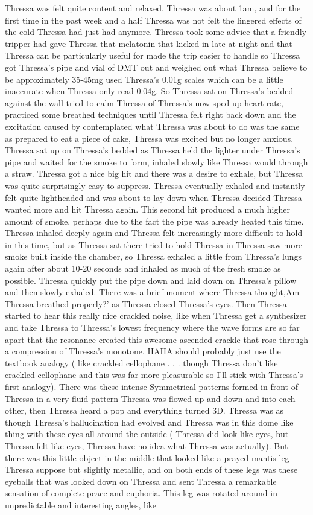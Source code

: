 \documentclass[12pt]{book}
\begin{document}
Thressa was felt quite content and relaxed. Thressa was about 1am, and for the first time in the past week and a half Thressa was not felt the lingered effects of the cold Thressa had just had anymore. Thressa took some advice that a friendly tripper had gave Thressa that melatonin that kicked in late at night and that Thressa can be particularly useful for made the trip easier to handle so Thressa got Thressa's pipe and vial of DMT out and weighed out what Thressa believe to be approximately 35-45mg used Thressa's 0.01g scales which can be a little inaccurate when Thressa only read 0.04g. So Thressa sat on Thressa's bedded against the wall tried to calm Thressa of Thressa's now sped up heart rate, practiced some breathed techniques until Thressa felt right back down and the excitation caused by contemplated what Thressa was about to do was the same as prepared to eat a piece of cake, Thressa was excited but no longer anxious. Thressa sat up on Thressa's bedded as Thressa held the lighter under Thressa's pipe and waited for the smoke to form, inhaled slowly like Thressa would through a straw. Thressa got a nice big hit and there was a desire to exhale, but Thressa was quite surprisingly easy to suppress. Thressa eventually exhaled and instantly felt quite lightheaded and was about to lay down when Thressa decided Thressa wanted more and hit Thressa again. This second hit produced a much higher amount of smoke, perhaps due to the fact the pipe was already heated this time. Thressa inhaled deeply again and Thressa felt increasingly more difficult to hold in this time, but as Thressa sat there tried to hold Thressa in Thressa saw more smoke built inside the chamber, so Thressa exhaled a little from Thressa's lungs again after about 10-20 seconds and inhaled as much of the fresh smoke as possible. Thressa quickly put the pipe down and laid down on Thressa's pillow and then slowly exhaled. There was a brief moment where Thressa thought,Am Thressa breathed properly?' as Thressa closed Thressa's eyes. Then Thressa started to hear this really nice crackled noise, like when Thressa get a synthesizer and take Thressa to Thressa's lowest frequency where the wave forms are so far apart that the resonance created this awesome ascended crackle that rose through a compression of Thressa's monotone. HAHA should probably just use the textbook analogy ( like crackled cellophane . . .  though Thressa don't like crackled cellophane and this was far more pleasurable so I'll stick with Thressa's first analogy). There was these intense Symmetrical patterns formed in front of Thressa in a very fluid pattern Thressa was flowed up and down and into each other, then Thressa heard a pop and everything turned 3D. Thressa was as though Thressa's hallucination had evolved and Thressa was in this dome like thing with these eyes all around the outside ( Thressa did look like eyes, but Thressa felt like eyes, Thressa have no idea what Thressa was actually). But there was this little object in the middle that looked like a prayed mantis leg Thressa suppose but slightly metallic, and on both ends of these legs was these eyeballs that was looked down on Thressa and sent Thressa a remarkable sensation of complete peace and euphoria. This leg was rotated around in unpredictable and interesting angles, like 
\end{document}
